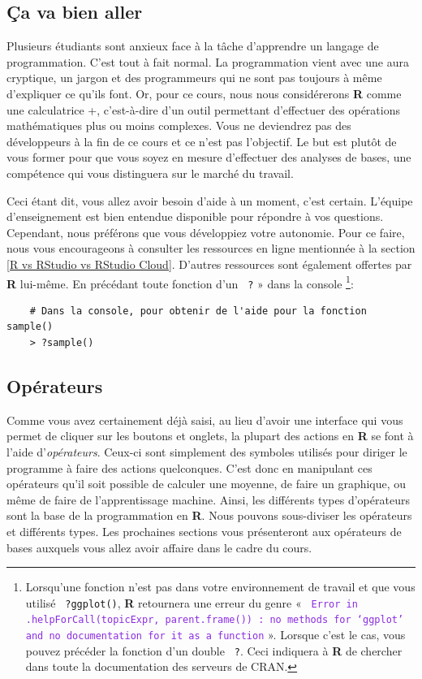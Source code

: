 \documentclass[10.5pt,a4paper]{article}
\newcommand{\rcode}[1]{\texttt{\color{rstudio} #1}}
\begin{document}
  \subsection{Ça va bien aller}
  Plusieurs étudiants sont anxieux face à la tâche d'apprendre un langage de programmation. C'est tout à fait normal. La programmation vient avec une aura cryptique, un jargon et des programmeurs qui ne sont pas toujours à même d'expliquer ce qu'ils font. Or, pour ce cours, nous nous considérerons \textbf{R} comme une calculatrice +, c'est-à-dire d'un outil permettant d'effectuer des opérations mathématiques plus ou moins complexes. Vous ne deviendrez pas des développeurs à la fin de ce cours et ce n'est pas l'objectif. Le but est plutôt de vous former pour que vous soyez en mesure d'effectuer des analyses de bases, une compétence qui vous distinguera sur le marché du travail.

Ceci étant dit, vous allez avoir besoin d'aide à un moment, c'est certain. L'équipe d'enseignement est bien entendue disponible pour répondre à vos questions. Cependant, nous préférons que vous développiez votre autonomie. Pour ce faire, nous vous encourageons à consulter les ressources en ligne mentionnée à la section \ref{R vs RStudio vs RStudio Cloud}. D'autres ressources sont également offertes par \textbf{R} lui-même. En précédant toute fonction d'un \rcode{?} » dans la console \footnote{Lorsqu'une fonction n'est pas dans votre environnement de travail et que vous utilisé \rcode{?ggplot()}, \textbf{R} retournera une erreur du genre « \textcolor{BlueViolet}{\rcode{Error in .helpForCall(topicExpr, parent.frame()) : no methods for ‘ggplot’ and no documentation for it as a function}} ». Lorsque c'est le cas, vous pouvez précéder la fonction d'un double \rcode{?}. Ceci indiquera à \textbf{R} de chercher dans toute la documentation des serveurs de CRAN.}:

  \begin{lstlisting}
    # Dans la console, pour obtenir de l'aide pour la fonction sample()
    > ?sample()
  \end{lstlisting}
  
  \subsection{Opérateurs}
 Comme vous avez certainement déjà saisi, au lieu d'avoir une interface qui vous permet de cliquer sur les boutons et onglets, la plupart des actions en \textbf{R} se font à l'aide d'\emph{opérateurs}. Ceux-ci sont simplement des symboles utilisés pour diriger le programme à faire des actions quelconques. C'est donc en manipulant ces opérateurs qu'il soit possible de calculer une moyenne, de faire un graphique, ou même de faire de l'apprentissage machine. Ainsi, les différents types d'opérateurs sont la base de la programmation en \textbf{R}. Nous pouvons sous-diviser les opérateurs et différents types. Les prochaines sections vous présenteront aux opérateurs de bases auxquels vous allez avoir affaire dans le cadre du cours. 
 
\end{document}
